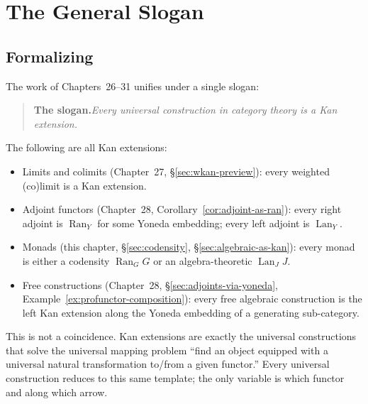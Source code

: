 \section{The General Slogan}
\label{sec:kan-slogan}

\subsection{Formalizing}

The work of Chapters~26--31 unifies under a single slogan:

\begin{quote}
\textbf{The slogan.}\quad \emph{Every universal construction in category
theory is a Kan extension.}
\end{quote}

\begin{theorem}
\label{thm:kan-subsumes}
The following are all Kan extensions:
\begin{itemize}
  \item Limits and colimits (Chapter~27, \S\ref{sec:wkan-preview}): every
        weighted (co)limit is a Kan extension.
  \item Adjoint functors (Chapter~28, Corollary~\ref{cor:adjoint-as-ran}):
        every right adjoint is $\operatorname{Ran}_Y$ for some Yoneda
        embedding; every left adjoint is $\operatorname{Lan}_Y$.
  \item Monads (this chapter, \S\ref{sec:codensity},
        \S\ref{sec:algebraic-as-kan}): every monad is either a codensity
        $\operatorname{Ran}_G G$ or an algebra-theoretic
        $\operatorname{Lan}_J J$.
  \item Free constructions (Chapter~28, \S\ref{sec:adjoints-via-yoneda},
        Example~\ref{ex:profunctor-composition}): every free algebraic
        construction is the left Kan extension along the Yoneda embedding
        of a generating sub-category.
\end{itemize}
\end{theorem}

\begin{remark}
This is not a coincidence. Kan extensions are exactly the universal
constructions that solve the universal mapping problem
``find an object equipped with a universal natural transformation to/from
a given functor.'' Every universal construction reduces to this same
template; the only variable is which functor and along which arrow.
\end{remark}


